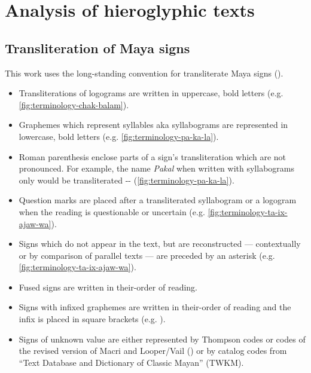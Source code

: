 \documentclass[../main.tex]{subfiles}
\begin{document}
\section{Analysis of hieroglyphic texts}

\subsection{Transliteration of Maya signs}
This work uses the long-standing convention for transliterate Maya signs (\cite{jamesjusteson1984}).
\begin{itemize}
    \item Transliterations of logograms are written in uppercase, bold letters 
          (e.g. \cref{fig:terminology-chak-balam}).
    \item Graphemes which represent syllables aka syllabograms are represented in 
          lowercase, bold letters (e.g. \cref{fig:terminology-pa-ka-la}).
    \item Roman parenthesis enclose parts of a sign's transliteration which are not pronounced.
          For example, the name \emph{Pakal} when written with syllabograms only would be 
          transliterated
          -- (\cref{fig:terminology-pa-ka-la}).
    \item Question marks are placed after a transliterated syllabogram or a 
          logogram when the reading is questionable or uncertain 
          (e.g. \cref{fig:terminology-ta-ix-ajaw-wa}).
    \item Signs which do not appear in the text, but are reconstructed 
          --- contextually or by comparison of parallel texts --- are preceded by an asterisk
          (e.g. \cref{fig:terminology-ta-ix-ajaw-wa}).
    \item Fused signs are written in their-order of reading.
    \item Signs with infixed graphemes are written in their-order of reading and the infix is placed
          in square brackets 
          (e.g. \syllabogram{[ko]}).
    \item Signs of unknown value are either represented by Thompson codes or codes of the 
          revised version of Macri and Looper/Vail (\cites{macrilooper2003}{macrivail2009}) 
          or by catalog codes from ``Text Database and Dictionary of Classic Mayan'' (TWKM).
\end{itemize}
\end{document}
